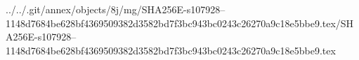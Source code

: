 ../../.git/annex/objects/8j/mg/SHA256E-s107928--1148d7684be628bf4369509382d3582bd7f3bc943bc0243c26270a9c18e5bbe9.tex/SHA256E-s107928--1148d7684be628bf4369509382d3582bd7f3bc943bc0243c26270a9c18e5bbe9.tex